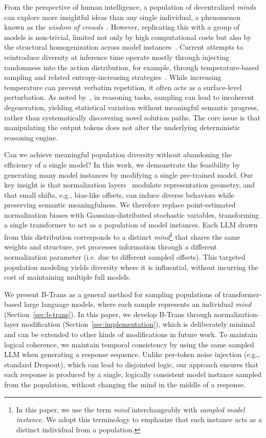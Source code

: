 \documentclass[11pt]{article}
\begin{document}
From the perspective of human intelligence, a population of decentralized \textit{minds} can explore more insightful ideas than any single individual, a phenomenon known as the \textit{wisdom of crowds}~\cite{surowiecki2005wisdom}. However, replicating this with a group of models is non-trivial, limited not only by high computational costs but also by the structural homogenization across model instances~\cite{jiang2025artificial}.
Current attempts to reintroduce diversity at inference time operate mostly through injecting randomness into the action distribution, for example, through temperature-based sampling and related entropy-increasing strategies~\cite{wang2022self}. While increasing temperature can prevent verbatim repetition, it often acts as a surface-level perturbation. 
As noted by~\citet{yue2025does}, in reasoning tasks, sampling can lead to incoherent degeneration, yielding statistical variation without meaningful semantic progress, rather than systematically discovering novel solution paths. The core issue is that manipulating the output tokens does not alter the underlying deterministic reasoning engine. 


Can we achieve meaningful population diversity without abandoning the efficiency of a single model? In this work, we demonstrate the feasibility by generating many model instances by modifying a single pre-trained model. Our key insight is that normalization layers~\cite{ba2016layer, zhang2019root} modulate representation geometry, and that small shifts, e.g., bias-like offsets, can induce diverse behaviors while preserving semantic meaningfulness.
We therefore replace point-estimated normalization biases with Gaussian-distributed stochastic variables, transforming a single transformer to act as a population of model instances. Each LLM drawn from this distribution corresponds to a distinct \textit{mind}\footnote{In this paper, we use the term \textit{mind} interchangeably with \textit{sampled model instance}. We adopt this terminology to emphasize that each instance acts as a distinct individual from a population.} that shares the same weights and structure, yet processes information through a different normalization parameter (i.e. due to different sampled offsets). This targeted population modeling yields diversity where it is influential, without incurring the cost of maintaining multiple full models.


We present B-Trans as a general method for sampling populations of transformer-based large language models, where each sample represents an individual \textit{mind} (Section~\ref{sec:b-trans}). In this paper, we develop B-Trans through normalization-layer modification (Section~\ref{sec:implementation}), which is deliberately minimal and can be extended to other kinds of modifications in future work. To maintain logical coherence, we maintain temporal consistency by using the same sampled LLM when generating a response sequence. Unlike per-token noise injection (e.g., standard Dropout), which can lead to disjointed logic, our approach ensures that each response is produced by a single, logically consistent model instance sampled from the population, without changing the mind in the middle of a response.
\end{document}
